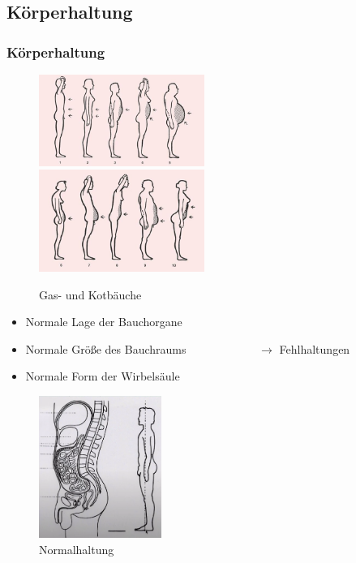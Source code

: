 \documentclass[xcolor=dvipsnames]{beamer}
\begin{document}
    \subsection{Körperhaltung}
    \begin{frame}[allowframebreaks]
        \frametitle{Körperhaltung}

        \begin{figure}
            \includegraphics[width=5.4cm]{../images/gasbauch.jpg}\\
            \includegraphics[width=5.4cm]{../images/kotbauch.jpg}
            \caption{Gas- und Kotbäuche}
        \end{figure}

        \begin{itemize}
            \item Normale Lage der Bauchorgane
            \item Normale Größe des Bauchraums ~~~~~~~~~~~~$\rightarrow$ Fehlhaltungen
            \item Normale Form der Wirbelsäule
        \end{itemize}

        \begin{figure}
            \includegraphics[width=4cm]{../images/normalhaltung.png}
            \caption{Normalhaltung}
        \end{figure}


\end{frame}
\end{document}
